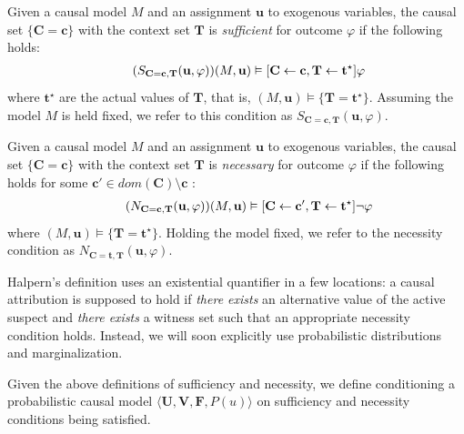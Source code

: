 \documentclass[anon,12pt]{clear2025} %
\begin{document}
\begin{definition}[Sufficiency]
    Given a causal model \(M\) and an assignment \(\mathbf{u}\) to exogenous variables, the causal set \(\{\mathbf{C} = \mathbf{c}\}\) with the context set $\mathbf{T}$ is \textit{sufficient} for outcome \(\varphi\) if the following holds:
    \begin{align}
    \tag{$S_{\mathbf{C} = \mathbf{c}, \mathbf{T}}(\mathbf{u}, \varphi)$}
    (M, \mathbf{u}) 
    \vDash [\mathbf{C} \leftarrow \mathbf{c}, \mathbf{T} \leftarrow \mathbf{t}^\star]\varphi
    \end{align}
     where $\mathbf{t}^\star$ are the actual values of $\mathbf{T}$, that is, \((M, \mathbf{u}) \vDash \{\mathbf{T} = \mathbf{t}^\star\}\). Assuming the model $M$ is held fixed,  we refer to this condition as \(S_{\mathbf{C} = \mathbf{c}, \mathbf{T}}(\mathbf{u}, \varphi)\).

\end{definition}

\begin{definition}[Necessity]
    Given a causal model \(M\) and an assignment \(\mathbf{u}\) to exogenous variables, the causal set \(\{\mathbf{C} = \mathbf{c}\}\) with the context set $\mathbf{T}$ is \textit{necessary} for outcome \(\varphi\) if the following holds for some  \(\mathbf{c'} \in \mathit{dom}(\mathbf{C})\setminus \mathbf{c}\) :
    \begin{align} \label{eq:nec}
        \tag{\(N_{\mathbf{C} = \mathbf{c}, \mathbf{T}}(\mathbf{u}, \varphi)\)}
    (M, \mathbf{u}) \vDash [\mathbf{C} \leftarrow \mathbf{c'}, \mathbf{T} \leftarrow \mathbf{t}^\star]\neg \varphi\end{align}
    where \((M, \mathbf{u}) \vDash \{\mathbf{T} = \mathbf{t}^\star\}\).
    Holding the model fixed, we refer to the necessity condition as \(N_{\mathbf{C} = \mathbf{t}, \mathbf{T}}(\mathbf{u}, \varphi)\).
\end{definition}

 Halpern's definition uses an existential quantifier in a few locations: a causal attribution is supposed to hold if \emph{there exists} an alternative value of the active suspect and \emph{there exists} a witness set such that an appropriate necessity condition holds.
 Instead, we will soon explicitly use probabilistic distributions and marginalization.


Given the above definitions of sufficiency and necessity, we define conditioning a probabilistic causal model \(\langle \mathbf{U}, \mathbf{V}, \mathbf{F}, P(u) \rangle\) on sufficiency and necessity conditions being satisfied.
\end{document}
